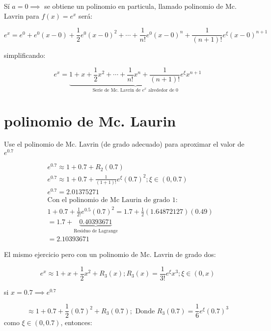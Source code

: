 Sí $a=0\implies $ se obtiene un polinomio en particula, llamado polinomio de Mc. Lavrin para $f(x)=e^x$ será:

\begin{equation*}
	e^x=e^0+e^0\left(x-0\right)+\frac{1}{2}e^0\left(x-0\right)^2+\cdots+\frac{1}{n!}e^0\left(x-0\right)^n+\frac{1}{\left(n+1\right)!}e^{\xi} \left(x-0\right)^{n+1}
\end{equation*}

simplificando:

\begin{equation*}
	e^x=\underbrace{1+x+\frac{1}{2}x^2+\cdots+\frac{1}{n!}x^n+\frac{1}{\left(n+1\right)!}e^{\xi} x^{n+1}}_{\text{Serie de Mc. Lavrin de $e^x$ alrededor de 0}}
\end{equation*}

\section{polinomio de Mc. Laurin}

Use el polinomio de Mc. Lavrin (de grado adecuado) para aproximar el valor de $e^{0.7}$

\begin{align*}
	 & e^0.7\approx 1+0.7+R_2(0.7)                                         \\
	 & e^0.7\approx 1+0.7+\frac{1}{(1+1)!}e^{\xi} (0.7)^2; \xi \in (0,0.7) \\
	 & e^0.7=2.01375271                                                    \\
	 & \text{Con el polinomio de Mc Laurin de grado 1: }                   \\
	 & 1+0.7+\frac{1}{2!}e^{0.5}(0.7)^2=1.7+\frac{1}{2}(1.64872127)(0.49)  \\
	 & =1.7+\underbrace{0.40393671}_{\text{Residuo de Lagrange}}           \\
	 & =2.10393671
\end{align*}

El mismo ejercicio pero con un polinomio de Mc. Lavrin de grado dos:

\begin{equation*}
	e^x\approx 1+x+\frac{1}{2}x^2+R_3(x); R_{3}(x)=\frac{1}{3!}e^{\xi}x^3;\xi\in(0,x)
\end{equation*}

si $x=0.7\implies e^0.7$

\begin{equation*}
	\approx1+0.7+\frac{1}{2}(0.7)^2+R_3(0.7); \text{ Donde } R_3(0.7)=\frac{1}{6}e^{\xi} (0.7)^3
\end{equation*}
como $\xi \in (0,0.7)$, entonces:

